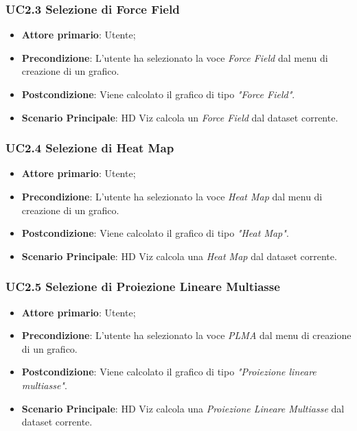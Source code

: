 \subsubsection{UC2.3 Selezione di Force Field}
\label{ssub:uc2.3}
\begin{itemize}

    \item \textbf{Attore primario}: Utente;

    \item \textbf{Precondizione}:   L'utente ha selezionato la voce \emph{Force Field} dal menu di creazione di un grafico.

    \item \textbf{Postcondizione}:  Viene calcolato il grafico di tipo \emph{"Force Field"}.
	
	\item \textbf{Scenario Principale}: HD Viz calcola un \emph{Force Field} dal dataset corrente.

\end{itemize}


\subsubsection{UC2.4 Selezione di Heat Map}
\label{ssub:uc2.4}
\begin{itemize}

    \item \textbf{Attore primario}: Utente;

	\item \textbf{Precondizione}:   L'utente ha selezionato la voce \emph{Heat Map} dal menu di creazione di un grafico.

    \item \textbf{Postcondizione}:  Viene calcolato il grafico di tipo \emph{"Heat Map"}.

	\item \textbf{Scenario Principale}: HD Viz calcola una \emph{Heat Map} dal dataset corrente.

\end{itemize}


\subsubsection{UC2.5 Selezione di Proiezione Lineare Multiasse}
\label{ssub:uc2.5}
\begin{itemize}

    \item \textbf{Attore primario}: Utente;

    \item \textbf{Precondizione}:   L'utente ha selezionato la voce \emph{PLMA} dal menu di creazione di un grafico.

    \item \textbf{Postcondizione}:  Viene calcolato il grafico di tipo \emph{"Proiezione lineare multiasse"}.

	\item \textbf{Scenario Principale}: HD Viz calcola una \emph{Proiezione Lineare Multiasse} dal dataset corrente.
\end{itemize}

